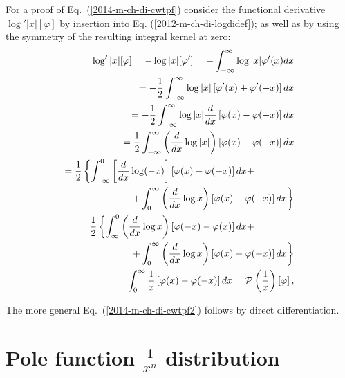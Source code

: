 
{\color{OliveGreen}
\bproof

For a proof of Eq.~(\ref{2014-m-ch-di-cwtpf}) consider the functional derivative
$\log' \vert x\vert [\varphi ]$
by insertion into Eq. (\ref{2012-m-ch-di-logdidef}); as well as by using the symmetry of the resulting integral kernel
 at zero:
\begin{equation}
\begin{split}
\log' \vert x\vert [\varphi ]
=
- \log \vert x\vert [\varphi ' ]
=
- \int_{-\infty}^\infty  \log \vert x\vert  \varphi '(x) dx
\\
=
- \frac{1}{2} \int_{-\infty}^\infty  \log \vert x\vert  \left[ \varphi '(x)   +\varphi '(- x) \right] dx  \\
=
- \frac{1}{2} \int_{-\infty}^\infty  \log \vert x\vert  \frac{d}{dx}  \left[ \varphi  (x)   -\varphi  (- x) \right] dx
\\
=
  \frac{1}{2} \int_{-\infty}^\infty   \left( \frac{d}{dx} \log \vert x\vert \right) \left[ \varphi  (x)   -\varphi  (- x) \right] dx    \\
=
  \frac{1}{2} \left\{ \int_{-\infty}^0   \left[ \frac{d}{dx} \log (- x) \right] \left[ \varphi  (x)   -\varphi  (- x) \right] dx
+ \right. \qquad \qquad \\ \left.
+   \int_{0}^\infty   \left( \frac{d}{dx} \log   x \right) \left[ \varphi  (x)   -\varphi  (- x) \right] dx \right\}
 \\
=
  \frac{1}{2} \left\{ \int_{\infty}^0   \left( \frac{d}{dx} \log  x \right) \left[ \varphi  (-x)   -\varphi  ( x) \right] dx
+ \right. \qquad \qquad \\ \left.
+  \int_{0}^\infty   \left( \frac{d}{dx} \log   x  \right) \left[ \varphi  (x)   -\varphi  (- x) \right] dx  \right\}
 \\
=
  \int_{0}^\infty   \frac{1}{x}   \left[ \varphi  (x)   -\varphi  (- x) \right] dx
=
{\cal P} \left(\frac{1}{x}\right) \left[\varphi\right]
,
\end{split}
\end{equation}

The more general Eq.~(\ref{2014-m-ch-di-cwtpf2}) follows by direct differentiation.

\eproof
}


\section{Pole function $\frac{1}{x^n}$ distribution}

